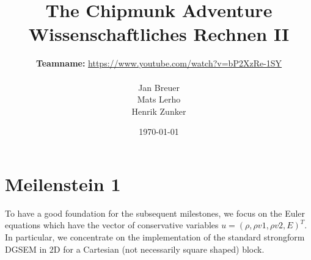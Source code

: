 \documentclass[11pt]{scrartcl}
\begin{document}


\title{{\Huge The Chipmunk Adventure} \\[18pt]
Wissenschaftliches Rechnen II \\[18pt]}
\author{\textbf{Teamname:} \href{https://www.youtube.com/watch?v=bP2XzRe-1SY}{https://www.youtube.com/watch?v=bP2XzRe-1SY} \\ \ \\
Jan Breuer\\
Mats Lerho \\
Henrik Zunker}
\date{\today}

\maketitle



\thispagestyle{empty} %


% 

\newpage
\tableofcontents
\thispagestyle{empty}
\newpage

\section{Meilenstein 1}
To have a good foundation for the subsequent milestones, we focus on the Euler equations which have the vector of conservative variables $u=(\rho, \rho v1, \rho v2, E)^T$. In particular, we concentrate on the implementation of the standard strongform DGSEM in $2$D for a Cartesian (not necessarily square shaped) block.
\end{document}
